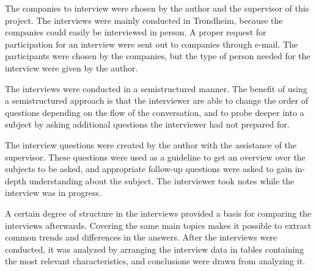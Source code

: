 The companies to interview were chosen by the author and the supervisor of this project. The interviews were mainly conducted in Trondheim, because the companies could easily be interviewed in person. A proper request for participation for an interview were sent out to companies through e-mail. The participants were chosen by the companies, but the type of person needed for the interview were given by the author.

The interviews were conducted in a semistructured manner. The benefit of using a semistructured approach is that the interviewer are able to change the order of questions depending on the flow of the conversation, and to probe deeper into a subject by asking additional questions the interviewer had not prepared for\cite{Oates:2006:RIS:1202299}. 

The interview questions were created by the author with the assistance of the supervisor. These questions were used as a guideline to get an overview over the subjects to be asked, and appropriate follow-up questions were asked to gain in-depth understanding about the subject. The interviewer took notes while the interview was in progress. 

A certain degree of structure in the interviews provided a basis for comparing the interviews afterwards. Covering the same main topics makes it possible to extract common trends and differences in the answers. After the interviews were conducted, it was analyzed by arranging the interview data in tables containing the most relevant characteristics, and conclusions were drawn from analyzing it.



